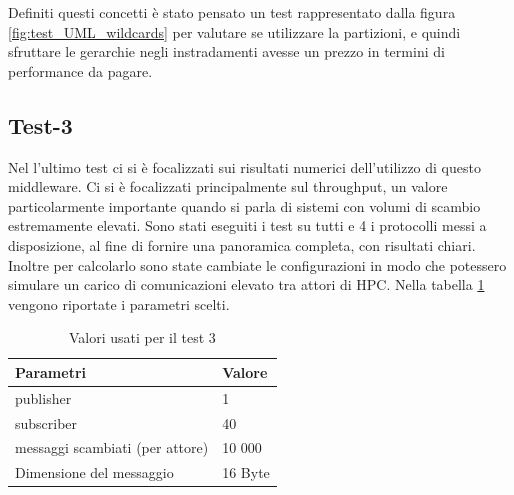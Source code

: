 Definiti questi concetti è stato pensato un test rappresentato dalla figura \ref{fig:test_UML_wildcards} per valutare se utilizzare la partizioni, e quindi sfruttare le gerarchie negli instradamenti avesse un prezzo in termini di performance da pagare.  


\subsection{Test-3}
Nel l'ultimo test ci si è focalizzati sui risultati numerici dell'utilizzo di questo middleware. Ci si è focalizzati principalmente sul throughput, un valore particolarmente importante quando si parla di sistemi con volumi di scambio estremamente elevati. Sono stati eseguiti i test su tutti e 4 i protocolli messi a disposizione, al fine di fornire una panoramica completa, con risultati chiari. Inoltre per calcolarlo sono state cambiate le configurazioni in modo che potessero simulare un carico di comunicazioni elevato tra attori di HPC. Nella tabella \ref{table:test3} vengono riportate i parametri scelti.

\begin{table}[H]
    \begin{center}
    \begin{tabular}{l|l}
        \hline
        \textbf{Parametri} & \textbf{Valore}\\
        \hline
        [\#] publisher & 1 \\
        \hline
        [\#] subscriber & 40 \\
        \hline
        [\#] messaggi scambiati (per attore) & 10 000 \\
        \hline
        Dimensione del messaggio & 16 Byte \\
        \hline
    \end{tabular}
    \end{center}
    \caption{Valori usati per il test 3}\label{table:test3}
    \end{table}
    
